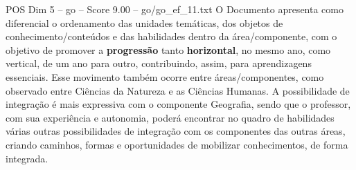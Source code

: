 \begin{textsample}{POS Dim 5 – go – Score 9.00 – go/go\_ef\_11.txt}
O Documento apresenta como diferencial o ordenamento das unidades temáticas, dos objetos de conhecimento/conteúdos e das habilidades dentro da área/componente, com o objetivo de promover a \textbf{progressão} tanto \textbf{horizontal}, no mesmo ano, como vertical, de um ano para outro, contribuindo, assim, para aprendizagens essenciais.
Esse movimento também ocorre entre áreas/componentes, como observado entre Ciências da Natureza e as Ciências Humanas.
A possibilidade de integração é mais expressiva com o componente Geografia, sendo que o professor, com sua experiência e autonomia, poderá encontrar no quadro de habilidades várias outras possibilidades de integração com os componentes das outras áreas, criando caminhos, formas e oportunidades de mobilizar conhecimentos, de forma integrada.

\end{textsample}
